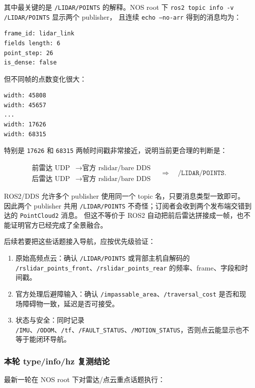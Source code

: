 \documentclass[UTF8,11pt,a4paper]{ctexart}
\begin{document}
其中最关键的是 \texttt{/LIDAR/POINTS} 的解释。NOS root 下 \texttt{ros2 topic info -v /LIDAR/POINTS} 显示两个 publisher，
且连续 \texttt{echo --no-arr} 得到的消息均为：

\begin{verbatim}
frame_id: lidar_link
fields length: 6
point_step: 26
is_dense: false
\end{verbatim}

但不同帧的点数变化很大：

\begin{verbatim}
width: 45808
width: 45657
...
width: 17626
width: 68315
\end{verbatim}

特别是 \texttt{17626} 和 \texttt{68315} 两帧时间戳非常接近，说明当前更合理的判断是：

\[
\begin{aligned}
\text{前雷达 UDP} &\rightarrow \text{官方 rslidar/bare DDS}\\
\text{后雷达 UDP} &\rightarrow \text{官方 rslidar/bare DDS}
\end{aligned}
\quad
\Longrightarrow
\quad
\texttt{/LIDAR/POINTS}.
\]

ROS2/DDS 允许多个 publisher 使用同一个 topic 名，只要消息类型一致即可。
因此两个 publisher 共用 \texttt{/LIDAR/POINTS} 不奇怪；订阅者会收到两个发布端交错到达的 \texttt{PointCloud2} 消息。
但这不等价于 ROS2 自动把前后雷达拼接成一帧，也不能证明官方已经完成了全景融合。

后续若要把这些话题接入导航，应按优先级验证：

\begin{enumerate}
  \item 原始高频点云：确认 \texttt{/LIDAR/POINTS} 或背部主机自解码的 \texttt{/rslidar\_points\_front}、\texttt{/rslidar\_points\_rear} 的频率、frame、字段和时间戳。
  \item 官方处理后避障输入：确认 \texttt{/impassable\_area}、\texttt{/traversal\_cost} 是否和现场障碍物一致，延迟是否可接受。
  \item 状态与安全：同时记录 \texttt{/IMU}、\texttt{/ODOM}、\texttt{/tf}、\texttt{/FAULT\_STATUS}、\texttt{/MOTION\_STATUS}，否则点云能显示也不等于能闭环导航。
\end{enumerate}

\subsubsection{本轮 type/info/hz 复测结论}

最新一轮在 NOS root 下对雷达/点云重点话题执行：
\end{document}
